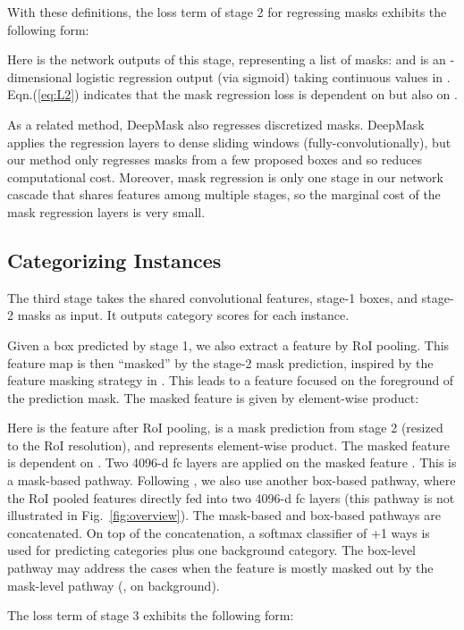 \documentclass[10pt,twocolumn,letterpaper]{article}
\begin{document}
With these definitions, the loss term  of stage 2 for regressing masks exhibits the following form:

Here  is the network outputs of this stage, representing a list of masks:  and  is an -dimensional logistic regression output (via sigmoid) taking continuous values in . Eqn.(\ref{eq:L2}) indicates that the mask regression loss  is dependent on  but also on .

As a related method, DeepMask \cite{Pinheiro2015} also regresses discretized masks. DeepMask applies the regression layers to dense sliding windows (fully-convolutionally), but our method only regresses masks from a few proposed boxes and so reduces computational cost.
Moreover, mask regression is only one stage in our network cascade that shares features among multiple stages, so the marginal cost of the mask regression layers is very small.

\subsection{Categorizing Instances}

The third stage takes the shared convolutional features, stage-1 boxes, and stage-2 masks as input. It outputs category scores for each instance.

Given a box predicted by stage 1, we also extract a feature by RoI pooling. This feature map is then ``masked'' by the stage-2 mask prediction, inspired by the feature masking strategy in \cite{Dai2015}. This leads to a feature focused on the foreground of the prediction mask.
The masked feature is given by element-wise product:

Here  is the feature after RoI pooling,  is a mask prediction from stage 2 (resized to the RoI resolution), and  represents element-wise product. The masked feature  is dependent on .
Two 4096-d fc layers are applied on the masked feature . This is a mask-based pathway. Following \cite{Hariharan2014}, we also use another box-based pathway, where the RoI pooled features directly fed into two 4096-d fc layers (this pathway is not illustrated in Fig.~\ref{fig:overview}). The mask-based and box-based pathways are concatenated. On top of the concatenation, a softmax classifier of +1 ways is used for predicting  categories plus one background category. The box-level pathway may address the cases when the feature is mostly masked out by the mask-level pathway (\eg, on background).


The loss term  of stage 3 exhibits the following form:
\end{document}
